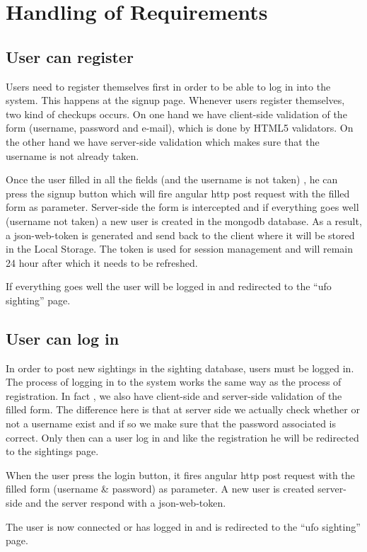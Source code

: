\documentclass{article}
\begin{document}
\section{Handling of Requirements}
\subsection{User can register}
Users need to register themselves first in order to be able to log in into the system.  This happens at the signup page. Whenever users register themselves, two kind of checkups occurs. On one hand we have client-side validation of the form (username, password and e-mail), which is done by  HTML5 validators. On the other hand we have server-side validation which makes sure that the username is not already taken. 

Once the user filled in all the fields (and the username is not taken) , he can press the signup button which will fire angular http post request with the filled form as parameter.
Server-side the form is intercepted and if everything goes well (username not taken) a new user is created in the mongodb database. As a result, a json-web-token is generated and send back to the client where it will be stored in the  Local Storage. The token is used for session management and will remain 24 hour after which it needs to be refreshed.

If everything goes well the user will be logged in and redirected to the “ufo sighting” page.

\subsection{User can log in}
In order to post new sightings in the sighting database, users must be logged in. The process of logging in to the system works the same way as the process of registration. In fact , we also have client-side and server-side validation of the filled form. The difference here is that at server side we actually check whether or not a username exist and if so we make sure that the password associated is correct. Only then can a user log in and like the registration he will be redirected to the sightings page.

When the user press the login button, it fires angular http post request with the filled form (username & password) as parameter. A new user is created server-side and the server respond with a json-web-token. 

The user is now connected or has logged in and is redirected to the “ufo sighting” page.
\end{document}
